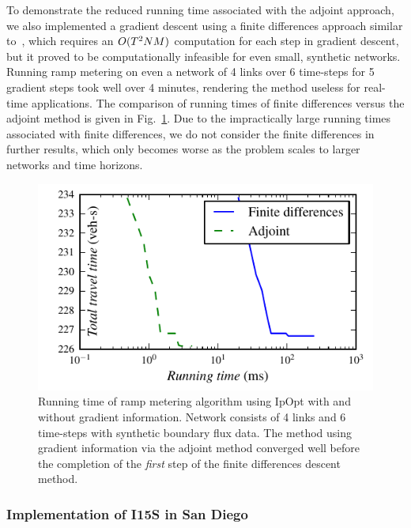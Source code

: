 \begin{note} To demonstrate the reduced running time associated with the adjoint approach, we also implemented a gradient descent using a finite differences approach similar to~\cite{Frejo2011,Ramon2013}, which requires an $O(T^2NM)$ computation for each step in gradient descent, but it proved to be computationally infeasible for even small, synthetic
networks. Running ramp metering on even a network of 4 links over
6 time-steps for 5 gradient steps took well over 4 minutes,
rendering the method useless for real-time applications. The comparison
of running times of finite differences versus the adjoint method is given in
Fig.~\ref{fig:Running-time-of}. Due to the impractically large running times associated with finite differences, we do not consider the finite differences in further results, which only becomes worse as the problem scales to larger networks and time horizons.
\end{note}
\begin{figure}[h]
\centering%
\includegraphics[width=0.5\columnwidth]{previous-articles/adjoint/images/itergrad}%
\caption{Running time of ramp metering algorithm using IpOpt with and without gradient information.
Network consists of 4 links and 6 time-steps with synthetic boundary
flux data. The method using gradient information via the adjoint
method converged well before the completion of the \textit{first} step of the finite differences descent method.
}%
\label{fig:Running-time-of}
\end{figure}



\subsubsection{Implementation of I15S in San Diego\label{sub:Network}}

